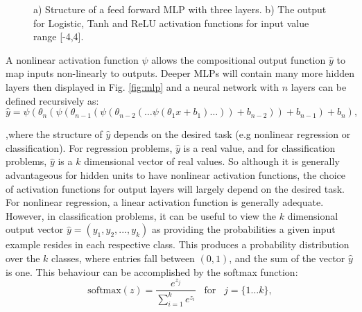 \begin{figure}[htb]
    \centering
    \hfill
        
    \caption{a) Structure of a feed forward MLP with three layers. b) The output for Logistic, Tanh and ReLU activation functions for input value range [-4,4].}\label{fig:mlp_actfunc}
\end{figure}

A nonlinear activation function $\psi$ allows the compositional output function $ \hat{y}$ to map inputs non-linearly to outputs. Deeper MLPs will contain many more hidden layers then displayed in Fig. \ref{fig:mlp} and a neural network with $n$ layers can be defined recursively as:
\begin{equation}
        \hat{y} = \psi(\theta_{n}(\psi(\theta_{n-1}(\psi(\theta_{n-2}(\ldots \psi(\theta_{1} x + b_{1}) \ldots)) + b_{n-2})) + b_{n-1}) + b_{n}),
\end{equation}

\noindent
,where the structure of $\hat{y}$ depends on the desired task (e.g nonlinear regression or classification). For regression problems, $\hat{y}$ is a real value, and for classification problems, $\hat{y}$ is a $k$ dimensional vector of real values. So although it is generally advantageous for hidden units to have nonlinear activation functions, the choice of activation functions for output layers will largely depend on the desired task. For nonlinear regression, a linear activation function is generally adequate. However, in classification problems, it can be useful to view the $k$ dimensional output vector $\hat{y} = (y_1,y_2,..., y_k)$ as providing the probabilities a given input example resides in each respective class. This produces a probability distribution over the $k$ classes, where entries fall between $(0,1)$, and the sum of the vector $\hat{y}$ is one. This behaviour can be accomplished by the softmax function:
\begin{equation}
       \mathrm{softmax}(z) = \frac{e^{z_j}}{\sum_{i=1}^{k}e^{z_i}} \;\;\; \mbox{for} \;\;\; j = \{1 \ldots k\},
\end{equation}

